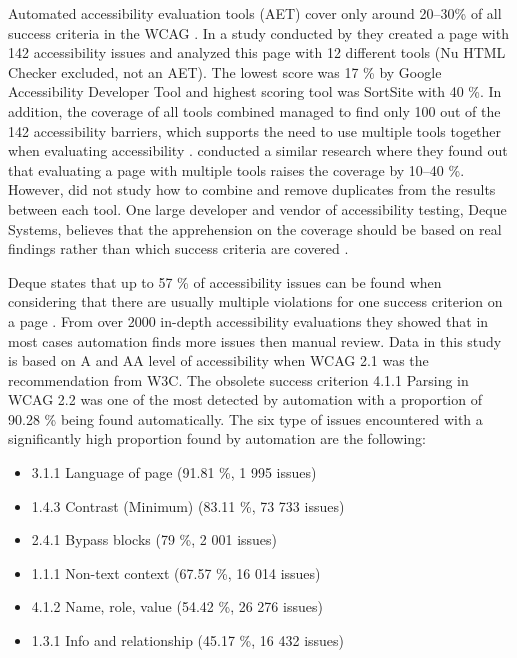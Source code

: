 Automated accessibility evaluation tools (AET) cover only around 20--30\% of all success criteria in the WCAG \citep{govukaccessibilityresults, webaimmillions, dequecoverage}. In a study conducted by \textcite{govukaccessibilityresults} they created a page with 142 accessibility issues and analyzed this page with 12 different tools (Nu HTML Checker excluded, not an AET). The lowest score was 17 \% by Google Accessibility Developer Tool and highest scoring tool was SortSite with 40 \%. In addition, the coverage of all tools combined managed to find only 100 out of the 142 accessibility barriers, which supports the need to use multiple tools together when evaluating accessibility \citep{govukaccessibilityresults_blog}. \textcite{comparison_10.1145/3371300.3383346} conducted a similar research where they found out that evaluating a page with multiple tools raises the coverage by 10--40 \%. However, \textcite{comparison_10.1145/3371300.3383346} did not study how to combine and remove duplicates from the results between each tool. One large developer and vendor of accessibility testing, Deque Systems, believes that the apprehension on the coverage should be based on real findings rather than which success criteria are covered \citep{dequecoverage}. 

Deque states that up to 57 \% of accessibility issues can be found when considering that there are usually multiple violations for one success criterion on a page \citep{dequecoverage}. From over 2000 in-depth accessibility evaluations they showed that in most cases automation finds more issues then manual review. Data in this study is based on A and AA level of accessibility when WCAG 2.1 was the recommendation from W3C. The obsolete success criterion 4.1.1 Parsing in WCAG 2.2 was one of the most detected by automation with a proportion of 90.28 \% being found automatically. The six type of issues encountered with a significantly high proportion found by automation are the following: 

\begin{itemize}
  \item 3.1.1 Language of page (91.81 \%, 1 995 issues)
  \item 1.4.3 Contrast (Minimum) (83.11 \%, 73 733 issues)
  \item 2.4.1 Bypass blocks (79 \%, 2 001 issues)
  \item 1.1.1 Non-text context (67.57 \%, 16 014 issues)
  \item 4.1.2 Name, role, value (54.42 \%, 26 276 issues)
  \item 1.3.1 Info and relationship (45.17 \%, 16 432 issues)
\end{itemize}

